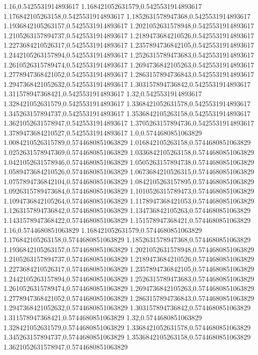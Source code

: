 1.16,0.5425531914893617
1.168421052631579,0.5425531914893617
1.176842105263158,0.5425531914893617
1.1852631578947368,0.5425531914893617
1.1936842105263157,0.5425531914893617
1.2021052631578948,0.5425531914893617
1.2105263157894737,0.5425531914893617
1.2189473684210526,0.5425531914893617
1.2273684210526317,0.5425531914893617
1.2357894736842105,0.5425531914893617
1.2442105263157894,0.5425531914893617
1.2526315789473683,0.5425531914893617
1.2610526315789474,0.5425531914893617
1.2694736842105263,0.5425531914893617
1.2778947368421052,0.5425531914893617
1.2863157894736843,0.5425531914893617
1.2947368421052632,0.5425531914893617
1.303157894736842,0.5425531914893617
1.311578947368421,0.5425531914893617
1.32,0.5425531914893617
1.328421052631579,0.5425531914893617
1.3368421052631578,0.5425531914893617
1.345263157894737,0.5425531914893617
1.3536842105263158,0.5425531914893617
1.3621052631578947,0.5425531914893617
1.3705263157894736,0.5425531914893617
1.3789473684210527,0.5425531914893617
1.0,0.5744680851063829
1.0084210526315789,0.5744680851063829
1.016842105263158,0.5744680851063829
1.0252631578947369,0.5744680851063829
1.0336842105263158,0.5744680851063829
1.0421052631578946,0.5744680851063829
1.0505263157894738,0.5744680851063829
1.0589473684210526,0.5744680851063829
1.0673684210526315,0.5744680851063829
1.0757894736842104,0.5744680851063829
1.0842105263157895,0.5744680851063829
1.0926315789473684,0.5744680851063829
1.1010526315789473,0.5744680851063829
1.1094736842105264,0.5744680851063829
1.1178947368421053,0.5744680851063829
1.1263157894736842,0.5744680851063829
1.134736842105263,0.5744680851063829
1.1431578947368422,0.5744680851063829
1.151578947368421,0.5744680851063829
1.16,0.5744680851063829
1.168421052631579,0.5744680851063829
1.176842105263158,0.5744680851063829
1.1852631578947368,0.5744680851063829
1.1936842105263157,0.5744680851063829
1.2021052631578948,0.5744680851063829
1.2105263157894737,0.5744680851063829
1.2189473684210526,0.5744680851063829
1.2273684210526317,0.5744680851063829
1.2357894736842105,0.5744680851063829
1.2442105263157894,0.5744680851063829
1.2526315789473683,0.5744680851063829
1.2610526315789474,0.5744680851063829
1.2694736842105263,0.5744680851063829
1.2778947368421052,0.5744680851063829
1.2863157894736843,0.5744680851063829
1.2947368421052632,0.5744680851063829
1.303157894736842,0.5744680851063829
1.311578947368421,0.5744680851063829
1.32,0.5744680851063829
1.328421052631579,0.5744680851063829
1.3368421052631578,0.5744680851063829
1.345263157894737,0.5744680851063829
1.3536842105263158,0.5744680851063829
1.3621052631578947,0.5744680851063829
